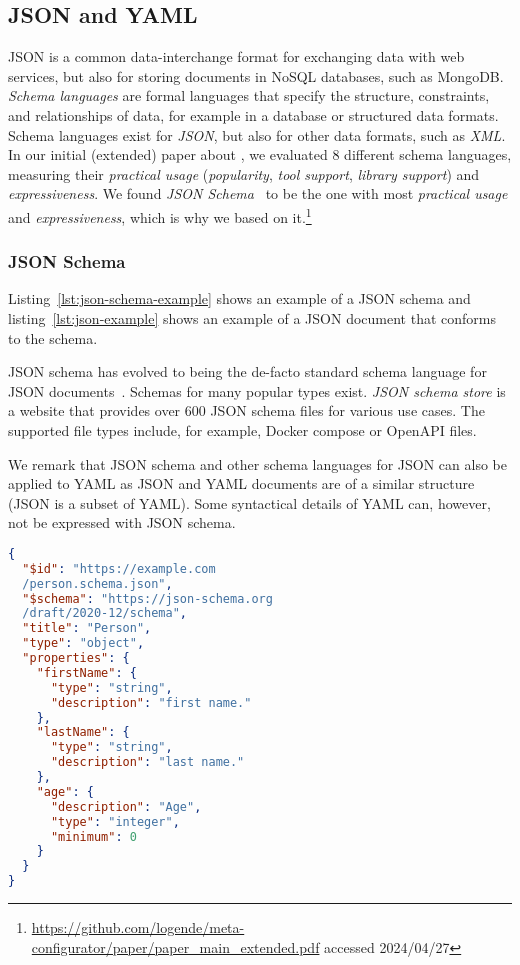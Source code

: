 \subsection{JSON and YAML}

JSON is a common data-interchange format for exchanging data with web services, but also for storing documents in NoSQL databases, such as MongoDB\@\cite{marrs2017json}.
\textit{Schema languages} are formal languages that specify the structure, constraints, and relationships of data, for example in a database or structured data formats.
Schema languages exist for \textit{JSON}\cite{cuelang,Apache-Avro,rfc8927,Kappestein_2023}, but also for other data formats, such as \textit{XML}\cite{dtd_spec, xsd_spec, xml_schemas_1, xml_schemas_2}.
In our initial (extended) paper about \toolname{}, we evaluated 8 different schema languages, measuring their \textit{practical usage} (\textit{popularity}, \textit{tool support}, \textit{library support}) and \textit{expressiveness}.
We found \textit{JSON Schema}~\cite{jsonSchema, jsonschemaJSONSchema} to be the one with most \textit{practical usage} and \textit{expressiveness}, which is why we based \toolname{} on it.\footnote{\url{https://github.com/logende/meta-configurator/paper/paper_main_extended.pdf} accessed 2024/04/27}

\subsubsection{JSON Schema}
Listing~\ref{lst:json-schema-example} shows an example of a JSON schema and listing~\ref{lst:json-example} shows an example of a JSON document that conforms to the schema.

JSON schema has evolved to being the de-facto standard schema language for JSON documents~\cite{baazizi2021empirical}.
Schemas for many popular \cfgfile{} types exist.
\textit{JSON schema store}\cite{schemastoreJSONSchema} is a website that provides over 600 JSON schema files for various use cases.
The supported file types include, for example, Docker compose or OpenAPI files.

We remark that JSON schema and other schema languages for JSON can also be applied to YAML as JSON and YAML documents are of a similar structure (JSON is a subset of YAML).
Some syntactical details of YAML can, however, not be expressed with JSON schema.


\begin{lstlisting}[language=json,firstnumber=1,caption={JSON schema example},captionpos=b,label={lst:json-schema-example}]
{
  "$id": "https://example.com
  /person.schema.json",
  "$schema": "https://json-schema.org
  /draft/2020-12/schema",
  "title": "Person",
  "type": "object",
  "properties": {
    "firstName": {
      "type": "string",
      "description": "first name."
    },
    "lastName": {
      "type": "string",
      "description": "last name."
    },
    "age": {
      "description": "Age",
      "type": "integer",
      "minimum": 0
    }
  }
}
\end{lstlisting}


